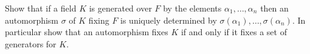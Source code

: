 \documentclass[12pt,letterpaper]{hmcpset}
\begin{document}
\begin{problem}[14.2.14]
  Show that if a field $K$ is generated over $F$ by the elements $\alpha_1, \dots , \alpha_n$ then an automorphism $\sigma$ of $K$ fixing $F$ is uniquely determined by $\sigma(\alpha_1), \dots, \sigma(\alpha_n)$. In particular show that an automorphism fixes $K$ if and only if it fixes a set of generators for $K$.
\end{problem}
\begin{solution}
\vfill
\end{solution}
\end{document}
